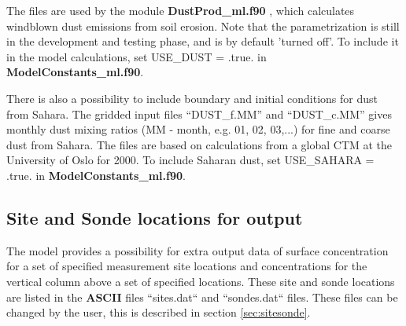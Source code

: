 The files are used by the module {\bf DustProd\_ml.f90 }, which calculates windblown dust 
emissions from soil erosion. Note that the parametrization is still in the development and 
testing phase, and is by default 'turned off'. To include it in the model calculations, set 
USE\_DUST = .true. in {\bf ModelConstants\_ml.f90}.

There is also a possibility to include boundary and initial conditions for dust from Sahara. 
The gridded input files ``DUST\_f.MM'' and ``DUST\_c.MM'' gives monthly dust mixing 
ratios (MM - month, e.g. 01, 02, 03,...) for fine and coarse dust from Sahara. The files are based on calculations 
from a global CTM at the University of Oslo for 2000. 
To include Saharan dust, set USE\_SAHARA = .true. in {\bf ModelConstants\_ml.f90}.



\subsection{Site and Sonde locations for output}\label{sec:sitessondes_input}
The model provides a possibility for extra output data of surface concentration 
for a set of specified measurement site locations and concentrations for the vertical 
column above a set of specified locations. These site and sonde locations are listed 
in the {\bf ASCII} files ``sites.dat`` and ``sondes.dat`` files. These files can be 
changed by the user, this is described in section \ref{sec:sitesonde}.

